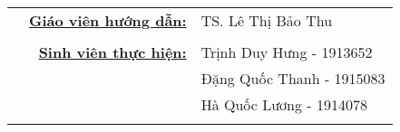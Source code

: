 	
\begin{table}[h]
    \begin{tabular}{rrl}
        \hspace{3cm} & \large{\textbf{\underline{Giáo viên hướng dẫn:}}} & \large{TS. Lê Thị Bảo Thu}       \\ \\
        & \large{\textbf{\underline{Sinh viên thực hiện:}}} 
        & \large{Trịnh Duy Hưng - 1913652} \\
                        &                                                          & \large{Đặng Quốc Thanh - 1915083} \\
                        &                                                          & \large{Hà Quốc Lương - 1914078}   \\ \\
    \end{tabular}
\end{table}